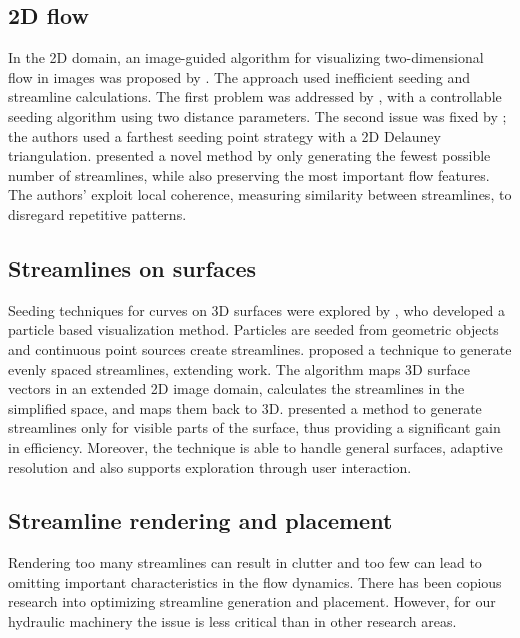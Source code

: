 \subsection{2D flow}

In the 2D domain, an image-guided algorithm for visualizing two-dimensional flow in images was proposed by \cite{Turk1996}.
The approach used inefficient seeding and streamline calculations.
The first problem was addressed by \cite{Jobard1997}, with a controllable seeding algorithm using two distance parameters.
The second issue was fixed by \cite{Mebarki2005}; the authors used a farthest seeding point strategy with a 2D Delauney triangulation.
\cite{Li2008} presented a novel method by only generating the fewest possible number of streamlines, while also preserving the most important flow features.
The authors' exploit local coherence,  measuring similarity between streamlines, to disregard repetitive patterns.

\subsection{Streamlines on surfaces}

Seeding techniques for curves on 3D surfaces were explored by \cite{VanWijk1992}, who developed a particle based visualization method.
Particles are seeded from geometric objects and continuous point sources create streamlines.
\cite{Mao1998} proposed a technique to generate evenly spaced streamlines, extending \cite{Turk1996} work.
The algorithm maps 3D surface vectors in an extended 2D image domain, calculates the streamlines in the simplified space, and maps them back to 3D. 
\cite{Spencer2009} presented a method to generate streamlines only for visible parts of the surface, thus providing a significant gain in efficiency.
Moreover, the technique is able to handle general surfaces, adaptive resolution and also supports exploration through user interaction.

\subsection{Streamline rendering and placement}

Rendering too many streamlines can result in clutter and too few can lead to omitting important characteristics in the flow dynamics.
There has been copious research into optimizing streamline generation and placement.
However, for our hydraulic machinery the issue is less critical than in other research areas.

